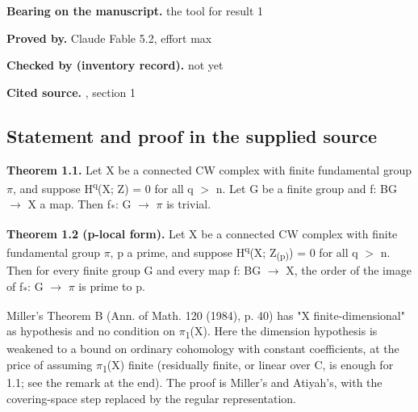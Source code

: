 \noindent\textbf{Bearing on the manuscript.} the tool for result 1\par\smallskip

\noindent\textbf{Proved by.} Claude Fable 5.2, effort max\par

\noindent\textbf{Checked by (inventory record).} not yet\par\smallskip

\noindent\textbf{Cited source.} , section 1\par\medskip

\subsection*{Statement and proof in the supplied source}

\textbf{Theorem 1.1.} Let X be a connected CW complex with finite fundamental group \ensuremath{\pi}, and suppose H\textsuperscript{q}(X; Z) = 0 for all q \ensuremath{>} n. Let G be a finite group and f: BG \ensuremath{\to} X a map. Then f\textsubscript{*}: G \ensuremath{\to} \ensuremath{\pi} is trivial.

\textbf{Theorem 1.2 (p-local form).} Let X be a connected CW complex with finite fundamental group \ensuremath{\pi}, p a prime, and suppose H\textsuperscript{q}(X; Z\textsubscript{(p)}) = 0 for all q \ensuremath{>} n. Then for every finite group G and every map f: BG \ensuremath{\to} X, the order of the image of f\textsubscript{*}: G \ensuremath{\to} \ensuremath{\pi} is prime to p.

Miller's Theorem B (Ann. of Math. 120 (1984), p. 40) has "X finite-dimensional" as hypothesis and no condition on \ensuremath{\pi}\textsubscript{1}(X). Here the dimension hypothesis is weakened to a bound on ordinary cohomology with constant coefficients, at the price of assuming \ensuremath{\pi}\textsubscript{1}(X) finite (residually finite, or linear over C, is enough for 1.1; see the remark at the end). The proof is Miller's and Atiyah's, with the covering-space step replaced by the regular representation.

